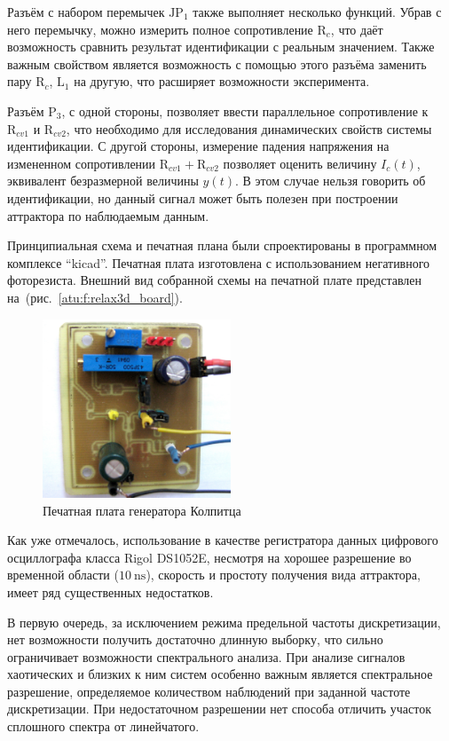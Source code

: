 Разъём с набором перемычек $\mathrm{JP}_1$ также выполняет несколько функций.
Убрав с него перемычку, можно измерить полное сопротивление $\mathrm{R}_{c}$,
что даёт возможность сравнить результат идентификации с реальным значением.
Также важным свойством является возможность с помощью этого разъёма
заменить пару $\mathrm{R}_{c}$, $\mathrm{L}_{1}$
на другую, что расширяет возможности эксперимента.

Разъём  $\mathrm{P}_{3}$, с одной стороны, позволяет
ввести параллельное сопротивление к
$\mathrm{R}_{cv1}$ и
$\mathrm{R}_{cv2}$, что необходимо для исследования динамических
свойств системы идентификации. С другой стороны,
измерение падения напряжения на измененном сопротивлении $\mathrm{R}_{cv1} +\mathrm{R}_{cv2}$
позволяет оценить величину $I_c(t)$, эквивалент безразмерной величины $y(t)$.
В этом случае нельзя говорить об идентификации, но данный сигнал может быть полезен
при построении аттрактора по наблюдаемым данным.


Принципиальная схема и печатная плана были спроектированы в
программном комплексе ``kicad''. %
Печатная плата изготовлена с использованием негативного фоторезиста.
Внешний вид собранной схемы на печатной плате представлен на~(рис.~\ref{atu:f:relax3d_board}).

\begin{figure}[htb!]
\centerline{\includegraphics[width=0.5\textwidth]{p/colp_board.jpg} }
\caption{Печатная плата генератора Колпитца}
\label{atu:f:colp_board}
\end{figure}


Как уже отмечалось, использование в качестве регистратора данных
цифрового осциллографа класса Rigol DS1052E,
несмотря на  хорошее разрешение во временной области ($\SI{10}{\nano\second}$),
скорость и простоту получения вида аттрактора,
имеет ряд существенных недостатков.

В первую очередь, за исключением режима предельной частоты дискретизации,
нет возможности получить достаточно длинную выборку, что
сильно ограничивает возможности спектрального анализа.
При анализе сигналов хаотических и близких к ним систем
особенно важным является спектральное разрешение,
определяемое количеством наблюдений при заданной частоте дискретизации.
При недостаточном разрешении нет способа отличить участок сплошного спектра
от линейчатого.

